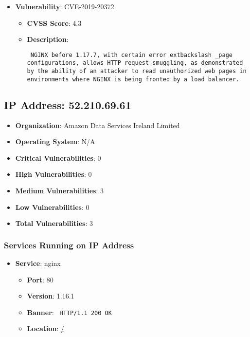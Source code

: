 \documentclass{article}
\begin{document}
\begin{itemize}
        \item \textbf{Vulnerability}: CVE-2019-20372
        \begin{itemize}
            \item \textbf{CVSS Score}:  4.3 
            \item \textbf{Description}: \parbox{\linewidth}{\texttt{ NGINX before 1.17.7, with certain error	extbackslash _page configurations, allows HTTP request smuggling, as demonstrated by the ability of an attacker to read unauthorized web pages in environments where NGINX is being fronted by a load balancer. }}
        \end{itemize}
    
\end{itemize}


\clearpage



\subsection*{IP Address: 52.210.69.61}

\begin{itemize}
    \item \textbf{Organization}: Amazon Data Services Ireland Limited
    \item \textbf{Operating System}:  N/A 
    \item \textbf{Critical Vulnerabilities}: 0
    \item \textbf{High Vulnerabilities}: 0
    \item \textbf{Medium Vulnerabilities}: 3
    \item \textbf{Low Vulnerabilities}: 0
    \item \textbf{Total Vulnerabilities}: 3
\end{itemize}

\subsubsection*{Services Running on IP Address}

\begin{itemize}
    
        \item \textbf{Service}: nginx
        \begin{itemize}
            \item \textbf{Port}: 80
            \item \textbf{Version}:  1.16.1 
            \item \textbf{Banner}: \texttt{ HTTP/1.1 200 OK
 }
            \item \textbf{Location}: \href{ / }{ / }
        \end{itemize}
    
\end{itemize}
\end{document}
